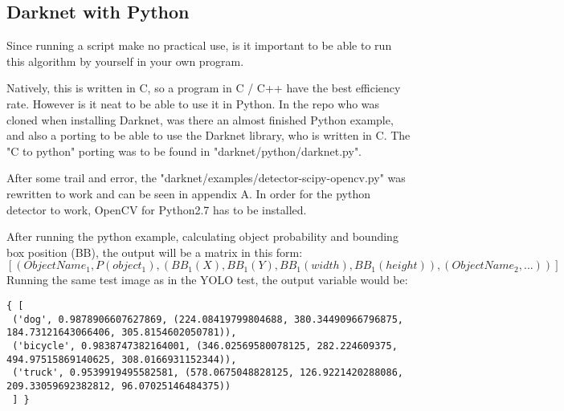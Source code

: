 \subsection{Darknet with Python}
Since running a script make no practical use, is it important to be able to run this algorithm by yourself in your own program.

Natively, this is written in C, so a program in C / C++ have the best efficiency rate. However is it neat to be able to use it in Python. In the repo who was cloned when installing Darknet, was there an almost finished Python example, and also a porting to be able to use the Darknet library, who is written in C. The "C to python" porting was to be found in "darknet/python/darknet.py".

After some trail and error, the "darknet/examples/detector-scipy-opencv.py" was rewritten to work and can be seen in appendix A. In order for the python detector to work, OpenCV for Python2.7 has to be installed.

After running the python example, calculating object probability and bounding box position (BB), the output will be a matrix in this form:
 \[
 {[ (Object Name_1,P(object_1), (BB_1(X), BB_1(Y),BB_1(width),BB_1(height)),(Object Name_2, ... )  )]}
 \]
 \newpage
 Running the same test image as in the YOLO test, the output variable would be:
\begin{lstlisting}[frame=single]  
 { [
 ('dog', 0.9878906607627869, (224.08419799804688, 380.34490966796875, 184.73121643066406, 305.8154602050781)), 
 ('bicycle', 0.9838747382164001, (346.02569580078125, 282.224609375, 494.97515869140625, 308.0166931152344)), 
 ('truck', 0.9539919495582581, (578.0675048828125, 126.9221420288086, 209.33059692382812, 96.07025146484375))
 ] } 
 \end{lstlisting}
